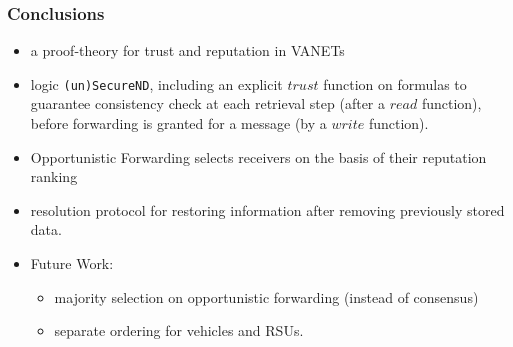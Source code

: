 \documentclass{beamer}
\begin{document}
\begin{frame}
\label{conclusions}
\frametitle{Conclusions}
\smallskip

\begin{itemize}
\item a proof-theory for trust and reputation in VANETs
\item logic \texttt{(un)SecureND}, including an explicit $trust$ function on formulas to guarantee consistency check at each retrieval step (after a $read$ function), before forwarding is granted for a message (by a $write$ function).
\item Opportunistic Forwarding selects receivers on the basis of their reputation ranking
\item resolution protocol for restoring information after removing previously stored data.

\item Future Work:
\begin{itemize}
\item majority selection on opportunistic forwarding (instead of consensus)
\item separate ordering for vehicles and RSUs.
\end{itemize}
\end{itemize}
\end{frame}
\end{document}
